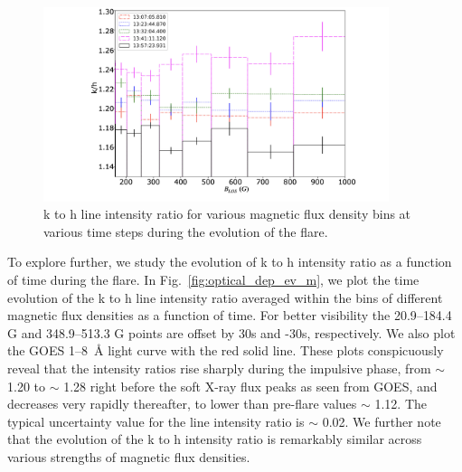 \begin{figure}[ht!]
    \centering
    \includegraphics[trim={8cm 1cm 2cm 0.2cm},clip,width=0.9\textwidth]{Figures/Flare-m-optical-depth-2.jpeg}
    \caption{  k to h line intensity ratio for various magnetic flux density bins at various time steps during the evolution of the flare.}
    \label{fig:optical_depth_m}
\end{figure}

To explore further, we study the evolution of k to h intensity ratio as a function of time during the flare. In Fig.~\ref{fig:optical_dep_ev_m}, we plot the time evolution of the k to h line intensity ratio averaged within the bins of different magnetic flux densities as a function of time. For better visibility the 20.9{--}184.4 G and 348.9{--}513.3 G points are offset by 30s and -30s, respectively. We also plot the GOES 1{--}8~{\AA} light curve with the red solid line. These plots conspicuously reveal that the intensity ratios rise sharply during the impulsive phase, from $\sim$ 1.20 to $\sim$ 1.28 right before the soft X-ray flux peaks as seen from GOES, and decreases very rapidly thereafter, to lower than pre-flare values $\sim$ 1.12. The typical uncertainty value for the line intensity ratio is $\sim$ 0.02. We further note that the evolution of the   k to h intensity ratio is remarkably similar across various strengths of magnetic flux densities.

